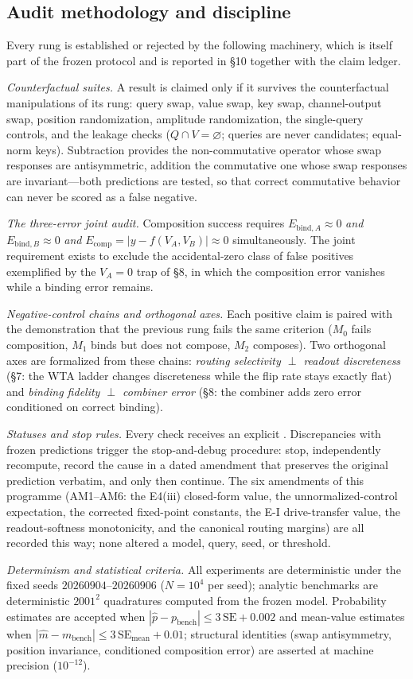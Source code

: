 \subsection{Audit methodology and discipline}
\label{sec:audit}

Every rung is established or rejected by the following machinery, which is
itself part of the frozen protocol and is reported in §10 together with the
claim ledger.

\emph{Counterfactual suites.} A result is claimed only if it survives the
counterfactual manipulations of its rung: query swap, value swap, key swap,
channel-output swap, position randomization, amplitude randomization, the
single-query controls, and the leakage checks ($Q\cap V=\varnothing$;
queries are never candidates; equal-norm keys). Subtraction provides the
non-commutative operator whose swap responses are antisymmetric, addition
the commutative one whose swap responses are invariant---both predictions
are tested, so that correct commutative behavior can never be scored as a
false negative.

\emph{The three-error joint audit.} Composition success requires
$E_{\mathrm{bind},A}\approx0$ \emph{and} $E_{\mathrm{bind},B}\approx0$
\emph{and} $E_{\mathrm{comp}}=|y-f(V_A,V_B)|\approx0$ simultaneously. The
joint requirement exists to exclude the accidental-zero class of false
positives exemplified by the $V_A=0$ trap of §8, in which the composition
error vanishes while a binding error remains.

\emph{Negative-control chains and orthogonal axes.} Each positive claim is
paired with the demonstration that the previous rung fails the same
criterion ($M_0$ fails composition, $M_1$ binds but does not compose,
$M_2$ composes). Two orthogonal axes are formalized from these chains:
\emph{routing selectivity $\perp$ readout discreteness} (§7: the WTA ladder
changes discreteness while the flip rate stays exactly flat) and
\emph{binding fidelity $\perp$ combiner error} (§8: the combiner adds zero
error conditioned on correct binding).

\emph{Statuses and stop rules.} Every check receives an explicit
\PassFailInconclusive{}. Discrepancies with frozen predictions trigger the
stop-and-debug procedure: stop, independently recompute, record the cause in
a dated amendment that preserves the original prediction verbatim, and only
then continue. The six amendments of this programme (AM1--AM6: the E4(iii)
closed-form value, the unnormalized-control expectation, the corrected
fixed-point constants, the E-I drive-transfer value, the readout-softness
monotonicity, and the canonical routing margins) are all recorded this way;
none altered a model, query, seed, or threshold.

\emph{Determinism and statistical criteria.} All experiments are
deterministic under the fixed seeds $20260904$--$20260906$ ($N=10^4$ per
seed); analytic benchmarks are deterministic $2001^2$ quadratures computed
from the frozen model. Probability estimates are accepted when
$|\hat p-p_{\mathrm{bench}}|\le3\,\mathrm{SE}+0.002$ and mean-value
estimates when $|\hat m-m_{\mathrm{bench}}|\le3\,\mathrm{SE}_{\mathrm{mean}}
+0.01$; structural identities (swap antisymmetry, position invariance,
conditioned composition error) are asserted at machine precision
($10^{-12}$).
